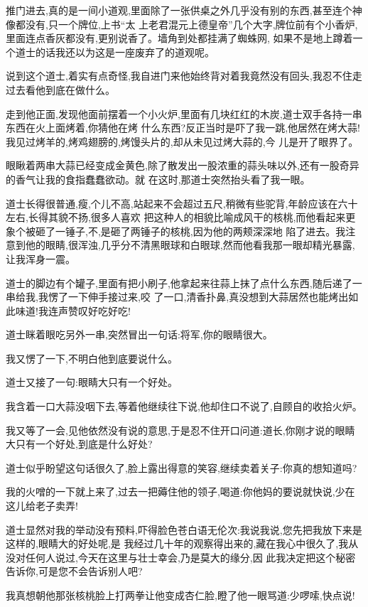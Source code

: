 ﻿\documentclass[12pt,twocolumn]{article}
\begin{document}
推门进去,真的是一间小道观,里面除了一张供桌之外几乎没有别的东西,甚至连个神像都没有,只一个牌位,上书``太
上老君混元上德皇帝''几个大字,牌位前有个小香炉,里面连点香灰都没有,更别说香了。墙角到处都挂满了蜘蛛网,
如果不是地上蹲着一个道士的话我还以为这是一座废弃了的道观呢。

说到这个道士,着实有点奇怪,我自进门来他始终背对着我竟然没有回头,我忍不住走过去看他到底在做什么。

走到他正面,发现他面前摆着一个小火炉,里面有几块红红的木炭,道士双手各持一串东西在火上面烤着,你猜他在烤
什么东西?反正当时是吓了我一跳,他居然在烤大蒜!我见过烤羊的,烤鸡翅膀的,烤馒头片的,却从未见过烤大蒜的,今
儿是开了眼界了。

眼瞅着两串大蒜已经变成金黄色,除了散发出一股浓重的蒜头味以外,还有一股奇异的香气让我的食指蠢蠢欲动。就
在这时,那道士突然抬头看了我一眼。

道士长得很普通,瘦,个儿不高,站起来不会超过五尺,稍微有些驼背,年龄应该在六十左右,长得其貌不扬,很多人喜欢
把这种人的相貌比喻成风干的核桃,而他看起来更象个被砸了一锤子,不,是砸了两锤子的核桃,因为他的两颊深深地
陷了进去。我注意到他的眼睛,很浑浊,几乎分不清黑眼球和白眼球,然而他看我那一眼却精光暴露,让我浑身一震。

道士的脚边有个罐子,里面有把小刷子,他拿起来往蒜上抹了点什么东西,随后递了一串给我,我愣了一下伸手接过来,咬
了一口,清香扑鼻,真没想到大蒜居然也能烤出如此味道!我连声赞叹好吃好吃!

道士眯着眼吃另外一串,突然冒出一句话:将军,你的眼睛很大。

我又愣了一下,不明白他到底要说什么。

道士又接了一句:眼睛大只有一个好处。

我含着一口大蒜没咽下去,等着他继续往下说,他却住口不说了,自顾自的收拾火炉。

我又等了一会,见他依然没有说的意思,于是忍不住开口问道:道长,你刚才说的眼睛大只有一个好处,到底是什么好处?

道士似乎盼望这句话很久了,脸上露出得意的笑容,继续卖着关子:你真的想知道吗?

我的火噌的一下就上来了,过去一把薅住他的领子,喝道:你他妈的要说就快说,少在这儿给老子卖弄!

道士显然对我的举动没有预料,吓得脸色苍白语无伦次:我说我说,您先把我放下来\dldots 是这样的,眼睛大的好处呢,是
我经过几十年的观察得出来的,藏在我心中很久了,我从没对任何人说过,今天在这里与壮士幸会,乃是莫大的缘分,因
此我决定把这个秘密告诉你,可是\dldots 您不会告诉别人吧?

我真想朝他那张核桃脸上打两拳让他变成杏仁脸,瞪了他一眼骂道:少啰嗦,快点说!
\end{document}

